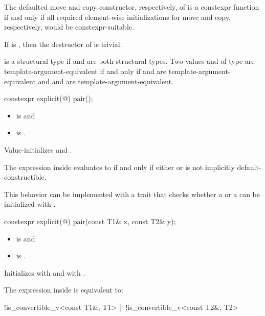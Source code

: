 \pnum
The defaulted move and copy constructor, respectively, of 
is a constexpr function if and only if all required element-wise
initializations for move and copy, respectively,
would be constexpr-suitable.

\pnum
If 
is , then the destructor of  is trivial.

\pnum
{} is a structural type
if  and  are both structural types.
Two values  and  of type 
are template-argument-equivalent if and only if
 and  are template-argument-equivalent and
 and  are template-argument-equivalent.

%
\begin{itemdecl}
constexpr explicit(@\seebelow@) pair();
\end{itemdecl}

\begin{itemdescr}
\pnum
\constraints
\begin{itemize}
\item {} is  and
\item {} is .
\end{itemize}

\pnum
\effects
Value-initializes  and .

\pnum
\remarks
The expression inside  evaluates to 
if and only if either  or
 is not implicitly default-constructible.
\begin{note}
This behavior can be implemented with a trait that checks
whether a  or a 
can be initialized with \tcode{\{\}}.
\end{note}
\end{itemdescr}

%
\begin{itemdecl}
constexpr explicit(@\seebelow@) pair(const T1& x, const T2& y);
\end{itemdecl}

\begin{itemdescr}
\pnum
\constraints
\begin{itemize}
\item {} is  and
\item {} is .
\end{itemize}

\pnum
\effects
Initializes  with  and  with .

\pnum
\remarks
The expression inside  is equivalent to:
\begin{codeblock}
!is_convertible_v<const T1&, T1> || !is_convertible_v<const T2&, T2>
\end{codeblock}
\end{itemdescr}

